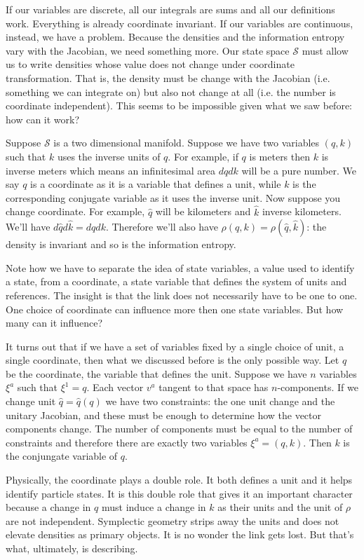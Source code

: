 \documentclass[11pt]{article}
\begin{document}
If our variables are discrete, all our integrals are sums and all our definitions work. Everything is already coordinate invariant. If our variables are continuous, instead, we have a problem. Because the densities and the information entropy vary with the Jacobian, we need something more. Our state space $\mathcal{S}$ must allow us to write densities whose value does not change under coordinate transformation. That is, the density must be change with the Jacobian (i.e. something we can integrate on) but also not change at all (i.e. the number is coordinate independent). This seems to be impossible given what we saw before: how can it work?

Suppose $\mathcal{S}$ is a two dimensional manifold. Suppose we have two variables $(q,k)$ such that $k$ uses the inverse units of $q$. For example, if $q$ is meters then $k$ is inverse meters which means an infinitesimal area $dq dk$ will be a pure number. We say $q$ is a coordinate as it is a variable that defines a unit, while $k$ is the corresponding conjugate variable as it uses the inverse unit. Now suppose you change coordinate. For example, $\hat{q}$ will be kilometers and $\hat{k}$ inverse kilometers. We'll have $d\hat{q} d\hat{k} = dq dk$. Therefore we'll also have $\rho(q,k) = \rho(\hat{q}, \hat{k})$: the density is invariant and so is the information entropy.

Note how we have to separate the idea of state variables, a value used to identify a state, from a coordinate, a state variable that defines the system of units and references. The insight is that the link does not necessarily have to be one to one. One choice of coordinate can influence more then one state variables. But how many can it influence?

It turns out that if we have a set of variables fixed by a single choice of unit, a single coordinate, then what we discussed before is the only possible way. Let $q$ be the coordinate, the variable that defines the unit. Suppose we have $n$ variables $\xi^a$ such that $\xi^1 = q$. Each vector $v^a$ tangent to that space has $n$-components. If we change unit $\hat{q}=\hat{q}(q)$ we have two constraints: the one unit change and the unitary Jacobian, and these must be enough to determine how the vector components change. The number of components must be equal to the number of constraints and therefore there are exactly two variables $\xi^a = (q, k)$. Then $k$ is the conjungate variable of $q$.

Physically, the coordinate plays a double role. It both defines a unit and it helps identify particle states. It is this double role that gives it an important character because a change in $q$ must induce a change in $k$ as their units and the unit of $\rho$ are not independent. Symplectic geometry strips away the units and does not elevate densities as primary objects. It is no wonder the link gets lost. But that's what, ultimately, is describing.
\end{document}
